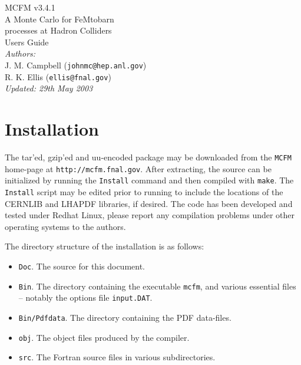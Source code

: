 \documentclass[12pt]{article}
\begin{document}
\def\GeV{\mbox{GeV}}

\thispagestyle{empty}
\vspace*{3cm}
\begin{center}
{\Huge MCFM v3.4.1} \\
\vspace*{0.5cm}
\Large{A Monte Carlo for FeMtobarn} \\
\Large{processes at Hadron Colliders} \\
\vspace*{2cm}
{\huge Users Guide} \\
\vspace*{4cm}
{\it Authors:} \\
\vspace*{0.2cm}
J. M. Campbell ({\tt johnmc@hep.anl.gov}) \\
R. K. Ellis ({\tt ellis@fnal.gov}) \\
\vspace*{2.5cm}
{\it \small Updated: 29th May 2003}
\end{center}

\newpage

\section{Installation}

The tar'ed, gzip'ed and uu-encoded package may be downloaded from
the {\tt MCFM} home-page at {\tt http://mcfm.fnal.gov}.
After extracting, the source can be initialized by running the
{\tt Install} command and then compiled with {\tt make}. The
{\tt Install} script may be edited prior to running to include
the locations of the CERNLIB and LHAPDF libraries, if desired.
The code has been developed and tested under Redhat Linux, please report
any compilation problems under other operating systems to the authors.

The directory structure of the installation is as follows:
\begin{itemize}
\item {\tt Doc}. The source for this document.
\item {\tt Bin}. The directory containing the executable {\tt mcfm},
and various essential files -- notably the options file {\tt input.DAT}.
\item {\tt Bin/Pdfdata}. The directory containing the PDF data-files.
\item {\tt obj}. The object files produced by the compiler. 
\item {\tt src}. The Fortran source files in various subdirectories.
\end{itemize}
\end{document}
